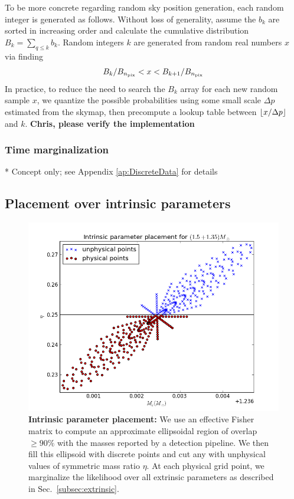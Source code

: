 To be more concrete regarding random sky position generation, each random integer is generated as follows. 
%
Without loss of generality, assume the $b_k$ are sorted in increasing order and calculate the cumulative distribution $B_k
= \sum_{q\le k} b_k$.   Random integers $k$ are generated from random real numbers $x$ via finding
\begin{eqnarray}
 B_k/B_{n_{\rm pix}} < x <  B_{k+1}/B_{n_{\rm pix}}
\end{eqnarray}
In practice, to reduce the need to search the $B_k$ array for each new random sample $x$, we quantize the possible probabilities
using some small scale $\Delta p$ estimated from the skymap, then  precompute a lookup table between $\floor*{x/\Delta
  p}$ and $k$.    \textbf{Chris, please verify the implementation}





\subsubsection{Time marginalization}

* Concept only; see Appendix \ref{ap:DiscreteData} for details



\subsection{Placement over intrinsic parameters}

\begin{figure}
\includegraphics[width=\columnwidth]{../Figures/linear_ellipse_placement.png}
\caption{\label{fig:linear_ellipse} \textbf{Intrinsic parameter placement:} We use an effective Fisher matrix to compute
an approximate ellipsoidal region of overlap $\geq 90\%$ with the masses reported by a detection pipeline.
We then fill this ellipsoid with discrete points and cut any with unphysical values of symmetric mass ratio $\eta$.
At each physical grid point, we marginalize the likelihood over all extrinsic parameters as described in
Sec.~\ref{subsec:extrinsic}.}
\end{figure}

